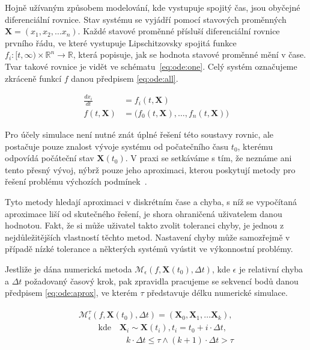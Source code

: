 Hojně užívaným způsobem modelování, kde vystupuje spojitý čas, jsou obyčejné diferenciální rovnice.
Stav systému se vyjádří pomocí stavových pro\-měn\-ných $\mathbf{X} = (\mathit{x_1}, \mathit{x_2}, \dots \mathit{x_n})$.
Každé stavové proměnné přísluší diferenciální rovni\-ce prvního řádu, ve které vystupuje
Lipschitzovsky spojitá \cite[str. 149 -- 163]{eriksson2004} funkce
$f_i: [t, \infty) \times \mathbb{R}^n \rightarrow \mathbb{R}$, která popisuje,
jak se hodnota stavové proměnné mění v čase. Tvar takové rovnice je vidět ve sché\-ma\-tu~\ref{eq:ode:one}.
Celý systém označujeme zkráceně funkcí $f$ danou předpisem \ref{eq:ode:all}.

\begin{align}
\label{eq:ode:one}
\frac{d\mathit{x_i}}{dt} &= f_i(t, \mathbf{X})									\\
\label{eq:ode:all}
f(t, \mathbf{X})		 &= \big(f_0(t, \mathbf{X}), \ldots, f_n(t, \mathbf{X})\big)
\end{align}

Pro účely simulace není nutné znát úplné řešení této soustavy rovnic, ale postačuje pouze znalost
vývoje systému od počatečního času $t_0$, kterému odpovídá počáteční stav $\mathbf{X}(t_0)$.
V praxi se setkáváme s tím, že neznáme ani tento přesný vývoj, nýbrž pouze jeho aproximaci,
kterou poskytují metody pro řešení problému výchozích podmínek~\cite{iserles1996}.

Tyto metody hledají aproximaci v diskrétním čase a chyba, s níž se vy\-po\-čí\-ta\-ná
aproximace liší od skutečného řešení, je shora ohraničená uživatelem danou hodnotou.
Fakt, že si může uživatel takto zvolit toleranci chy\-by, je jednou z nejdůležitějších
vlastností těchto metod. Nastavení chyby může samozřejmě v případě nízké tolerance
a některých systémů vyústit ve vý\-kon\-nost\-ní problémy.

Jestliže je dána numerická metoda $\mathcal{M}_\epsilon(f, \mathbf{X}(t_0), \Delta t)$,
kde $\epsilon$ je relativní chyba a $\Delta t$ požadovaný časový krok,
pak zpravidla pracujeme se sekvencí bodů danou předpisem \ref{eq:ode:aprox},
ve kterém $\tau$ představuje délku numerické simulace.

\begin{align}
\begin{array}{ll}
\label{eq:ode:aprox}
\mathcal{M}^\tau_\epsilon(f, \mathbf{X}(t_0), \Delta t) = (\mathbf{X}_0, \mathbf{X}_1, \ldots \mathbf{X}_k), \\
\textrm{~~~~~~~kde~~~}\mathbf{X}_i \sim \mathbf{X}(t_i), t_i = t_0 + i \cdot \Delta t,	\\
\textrm{~~~~~~~~~~~~~~~~~}k \cdot \Delta t \leq \tau \wedge (k+1) \cdot \Delta t > \tau
\end{array}
\end{align}

